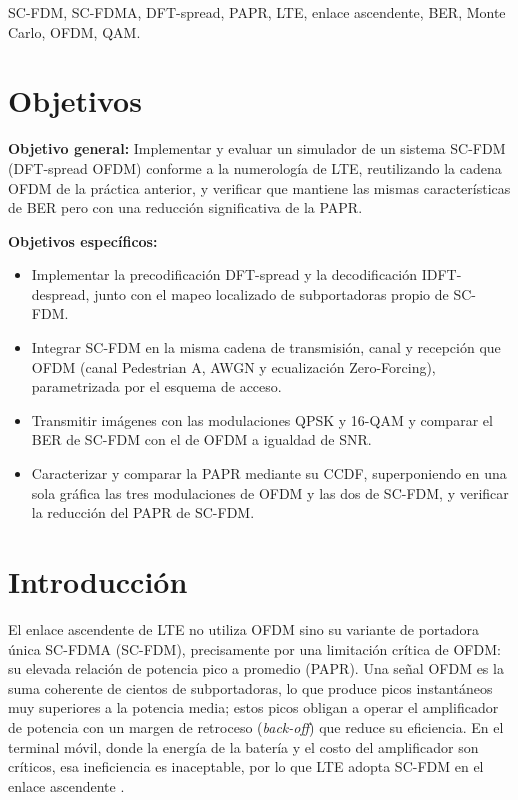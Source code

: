 \documentclass[conference,onecolumn]{IEEEtran}
\begin{document}
\begin{IEEEkeywords}
SC-FDM, SC-FDMA, DFT-spread, PAPR, LTE, enlace ascendente, BER, Monte Carlo, OFDM, QAM.
\end{IEEEkeywords}

\section*{Objetivos}

\textbf{Objetivo general:} Implementar y evaluar un simulador de un sistema SC-FDM (DFT-spread OFDM) conforme a la numerolog\'ia de LTE, reutilizando la cadena OFDM de la pr\'actica anterior, y verificar que mantiene las mismas caracter\'isticas de BER pero con una reducci\'on significativa de la PAPR.

\textbf{Objetivos espec\'ificos:}
\begin{itemize}
    \item Implementar la precodificaci\'on DFT-spread y la decodificaci\'on IDFT-despread, junto con el mapeo localizado de subportadoras propio de SC-FDM.
    \item Integrar SC-FDM en la misma cadena de transmisi\'on, canal y recepci\'on que OFDM (canal Pedestrian A, AWGN y ecualizaci\'on Zero-Forcing), parametrizada por el esquema de acceso.
    \item Transmitir im\'agenes con las modulaciones QPSK y 16-QAM y comparar el BER de SC-FDM con el de OFDM a igualdad de SNR.
    \item Caracterizar y comparar la PAPR mediante su CCDF, superponiendo en una sola gr\'afica las tres modulaciones de OFDM y las dos de SC-FDM, y verificar la reducci\'on del PAPR de SC-FDM.
\end{itemize}

\section{Introducci\'on}

El enlace ascendente de LTE no utiliza OFDM sino su variante de portadora \'unica SC-FDMA (SC-FDM), precisamente por una limitaci\'on cr\'itica de OFDM: su elevada relaci\'on de potencia pico a promedio (PAPR). Una se\~nal OFDM es la suma coherente de cientos de subportadoras, lo que produce picos instant\'aneos muy superiores a la potencia media; estos picos obligan a operar el amplificador de potencia con un margen de retroceso (\textit{back-off}) que reduce su eficiencia. En el terminal m\'ovil, donde la energ\'ia de la bater\'ia y el costo del amplificador son cr\'iticos, esa ineficiencia es inaceptable, por lo que LTE adopta SC-FDM en el enlace ascendente \cite{myung2006scfdma,3gpp36211}.
\end{document}
